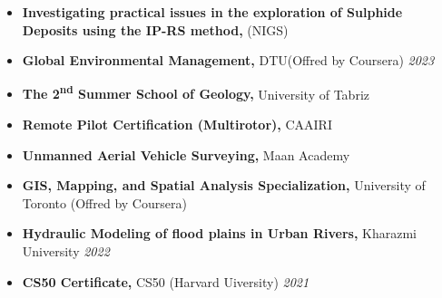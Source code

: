\documentclass[letterpaper,11pt]{article}
\begin{document}
	\vspace{-1.2em}
	\begin{itemize}[left=0pt, label={}, topsep=7.5pt, partopsep=0pt, itemsep=6pt, parsep=0pt]
		\item \textbf{Investigating practical issues in the exploration of Sulphide Deposits using the IP-RS method,} (NIGS)\footnotemark[1]
	\end{itemize}
	\vspace{-1.2em}
	\begin{itemize}[left=0pt, label={}, topsep=7.5pt, partopsep=0pt, itemsep=6pt, parsep=0pt]
		\item \textbf{Global Environmental Management,} DTU\footnotemark[2] (Offred by Coursera)  \hfill \textit{2023}
	\end{itemize}
	\vspace{-1.2em}
	\begin{itemize}[left=0pt, label={}, topsep=7.5pt, partopsep=0pt, itemsep=6pt, parsep=0pt]
	\item \textbf{The 2\textsuperscript{nd} Summer School of Geology,} University of Tabriz\hfill \textit{}
    \end{itemize}
	\vspace{-1.2em}
	\begin{itemize}[left=0pt, label={}, topsep=7.5pt, partopsep=0pt, itemsep=6pt, parsep=0pt]
		\item \textbf{Remote Pilot Certification (Multirotor),} CAAIRI\footnotemark[3] \hfill \textit{}
	\end{itemize}
	\vspace{-1.2em}
	\begin{itemize}[left=0pt, label={}, topsep=7.5pt, partopsep=0pt, itemsep=6pt, parsep=0pt]
		\item \textbf{Unmanned Aerial Vehicle Surveying,} Maan Academy  \hfill \textit{}
	\end{itemize}
	\vspace{-1.2em}
	\begin{itemize}[left=0pt, label={}, topsep=7.5pt, partopsep=0pt, itemsep=6pt, parsep=0pt]
		\item \textbf{GIS, Mapping, and Spatial Analysis Specialization,} University of Toronto (Offred by Coursera) \hfill \textit{}
	\end{itemize}
	\vspace{-1.2em}
	\begin{itemize}[left=0pt, label={}, topsep=7.5pt, partopsep=0pt, itemsep=6pt, parsep=0pt]
		\item \textbf{Hydraulic Modeling of flood plains in Urban Rivers,}  Kharazmi University \hfill \textit{2022}
	\end{itemize}
	\vspace{-1.2em}
	\begin{itemize}[left=0pt, label={}, topsep=7.5pt, partopsep=0pt, itemsep=6pt, parsep=0pt]
		\item \textbf{CS50 Certificate,}  CS50 (Harvard Uiversity) \hfill \textit{2021}
	\end{itemize}
	\vspace{-1.2em}
\end{document}
